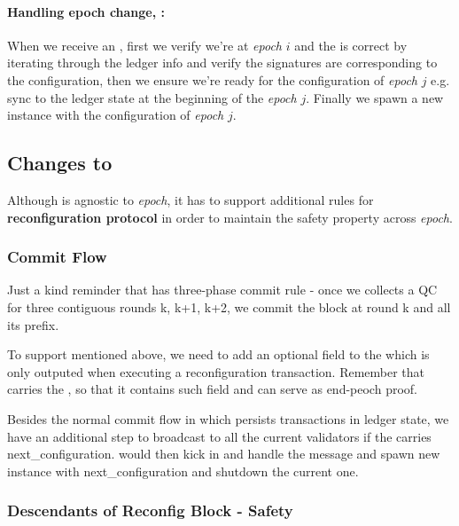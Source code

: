 \paragraph{Handling epoch change, :}

When we receive an , first we verify we're at \emph{epoch} $i$ and the  is correct by iterating through the
ledger info and verify the signatures are corresponding to the configuration, then we ensure we're ready for the configuration of \emph{epoch}
$j$ e.g. sync to the ledger state at the beginning of the \emph{epoch} $j$. Finally we spawn a new \LBFT instance with
 the configuration of \emph{epoch} $j$.

\subsection{Changes to \LBFT}

Although \LBFT is agnostic to \emph{epoch}, it has to support additional rules for \textbf{reconfiguration protocol} in order to
maintain the safety property across \emph{epoch}.

\subsubsection{Commit Flow}
Just a kind reminder that \LBFT has three-phase commit rule - once we collects a QC for three contiguous rounds k, k+1, k+2, we commit the block at round k
and all its prefix.

To support  mentioned above, we need to add an optional field  to the 
which is only outputed when executing a reconfiguration transaction. Remember that  carries the ,
so that it contains such field and can serve as end-peoch proof.

Besides the normal commit flow in \LBFT which persists transactions in ledger state, we have an additional step to broadcast
 to all the current validators if the  carries next\_configuration. 
would then kick in and handle the  message and spawn new \LBFT instance with next\_configuration and shutdown the current one.

\subsubsection{Descendants of Reconfig Block - Safety} \label{safety}

